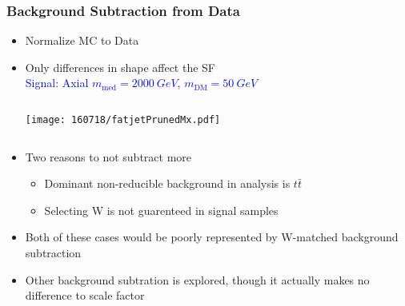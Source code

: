 \documentclass{beamer}
\begin{document}
\begin{frame}
  \frametitle{Background Subtraction from Data}
  \begin{itemize}
  \item Normalize MC to Data
  \item Only differences in shape affect the SF \vspace{-2pt} \\
    \textcolor{blue}{\scriptsize \hspace{-35pt} Signal: Axial
      $m_\text{med} = \SI{2000}{GeV}$,
      $m_\text{DM} = \SI{50}{GeV}$}
    \begin{columns}
      \begin{column}{0.4\linewidth}
        \centering
        \texttt{[image: 160718/fatjetPrunedMx.pdf]}
      \end{column}
    \end{columns}
  \item Two reasons to not subtract more
    \begin{itemize}
    \item Dominant non-reducible background in analysis is $t\bar{t}$
    \item Selecting W is not guarenteed in signal samples
    \end{itemize}
  \item Both of these cases would be poorly represented by
    W-matched background subtraction
  \item Other background subtration is explored, though it actually makes no
    difference to scale factor
  \end{itemize}
\end{frame}
\end{document}
